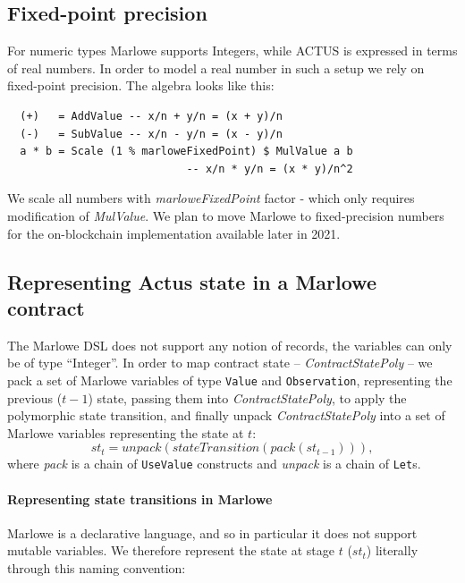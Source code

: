\documentclass[runningheads]{llncs}
\newcommand{\ident}[1]{\mbox{\emph{#1}}}
\begin{document}
\subsection{Fixed-point precision }

For numeric types Marlowe supports Integers, while ACTUS is expressed in terms
of real numbers. In order to model a real number in such a setup
we rely on fixed-point precision. The algebra looks like this: 
\begin{verbatim}
  (+)   = AddValue -- x/n + y/n = (x + y)/n
  (-)   = SubValue -- x/n - y/n = (x - y)/n
  a * b = Scale (1 % marloweFixedPoint) $ MulValue a b 
                            -- x/n * y/n = (x * y)/n^2
\end{verbatim}
We scale all numbers with \emph{marloweFixedPoint} factor - which only requires modification of \emph{MulValue}.
\noindent
We plan to move Marlowe to fixed-precision numbers for the on-blockchain implementation available later in 2021.

\subsection{Representing Actus state in a Marlowe contract}

The Marlowe DSL does not support any notion of records,
the variables can only be of type ``Integer''. In order to
map contract state -- \emph{ContractStatePoly} -- we pack a set of Marlowe
variables of type \texttt{Value} and \texttt{Observation}, representing the previous ($t-1$) state, passing them into
\emph{ContractStatePoly}, to apply the polymorphic state transition, and
finally unpack \emph{ContractStatePoly} into a set of Marlowe variables representing the 
 state at $t$:
\noindent 
\begin{equation*}
st_{t}=unpack(stateTransition(pack(st_{t-1}))),
\end{equation*}
\noindent
where \emph{pack} is a chain of \texttt{UseValue} constructs and \ident{unpack} is a chain of
\texttt{Let}s.

\paragraph{Representing state transitions in Marlowe}

Marlowe is a declarative language, and so in particular it does not support mutable variables. We therefore represent the state at stage $t$ ($st_{t}$) literally through this naming convention:
\end{document}
